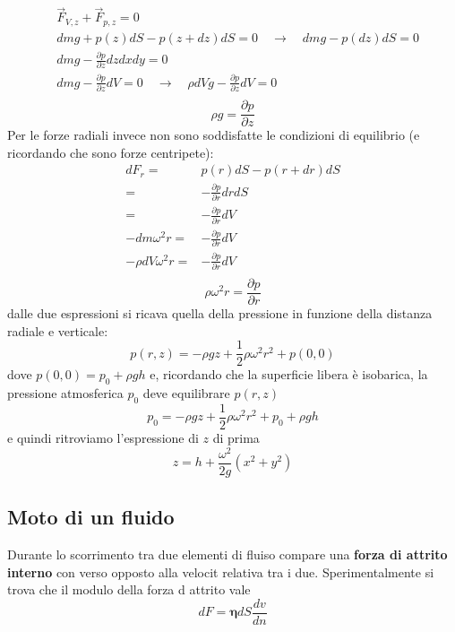 \documentclass[x11names]{article}
\begin{document}
	\begin{align*}
			&\overrightarrow{F}_{V,z} + \overrightarrow{F}_{p,z} = 0 \\
			& dm g + p(z)dS - p(z+dz)dS = 0 \quad  \to \quad dmg - p(dz)dS = 0\\
			& dmg - \frac{\partial p}{\partial z}dzdxdy = 0 \\
			& dmg - \frac{\partial p}{\partial z}dV = 0  \quad \to \quad \rho dV g -  \frac{\partial p}{\partial z}dV = 0 \\
	\end{align*}
	\[ 
	\boxed{\rho g = \frac{\partial p}{\partial z}}
	\]
	Per le forze radiali invece non sono soddisfatte le condizioni di equilibrio (e ricordando che sono forze centripete):
	\begin{align*}
		dF_{r} =& p(r)dS - p(r+dr)dS \\
			   =& - \frac{\partial p}{\partial r}drdS \\
			   =& - \frac{\partial p}{\partial r}dV \\
		-dm \omega^2 r =& - \frac{\partial p}{\partial r}dV \\
		-\rho dV \omega^2 r =& - \frac{\partial p}{\partial r}dV \\
	\end{align*}
	\[ 
	\boxed{\rho \omega^2 r =  \frac{\partial p}{\partial r}}
	\]
	dalle due espressioni si ricava quella della pressione in funzione della distanza radiale e verticale:
	\begin{equation}
		p(r,z) = -\rho gz + \frac{1}{2}\rho \omega ^2 r^2 + p(0,0)
	\end{equation}
	dove \(p(0,0) = p_{0} + \rho gh\) e, ricordando che la superficie libera è isobarica, la pressione atmosferica \(p_{0}\) deve equilibrare \(p(r,z)\)
	\[ 
	p_{0} =  -\rho gz + \frac{1}{2}\rho \omega ^2 r^2 + p_{0} + \rho gh
	\]
	e quindi ritroviamo l'espressione di \(z\) di prima
	\[ 
	z = h +\frac{\omega ^2}{2g}(x^2 +y^2)
	\]
	
	\subsection{Moto  di un fluido}
	Durante lo scorrimento tra due elementi di fluiso compare una \textbf{forza di attrito interno} con verso opposto alla velocit relativa tra i due. Sperimentalmente si trova che il modulo della forza d attrito vale 
	\begin{equation}
		dF = \boldsymbol{\eta} dS \frac{dv}{dn}
	\end{equation}
	
\end{document}
